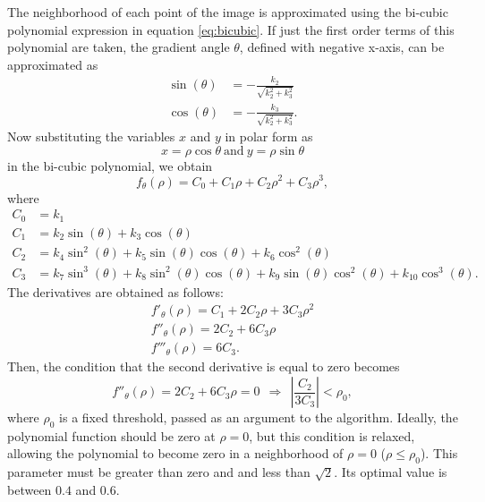 \documentclass{ipol}
\numberwithin{equation}{section}
\numberwithin{table}{section}
\begin{document}
The neighborhood of each point of the image is approximated using the bi-cubic polynomial 
expression in equation \ref{eq:bicubic}. If just the first order terms of this 
polynomial are taken, the gradient angle $\theta$, defined with negative x-axis, can be approximated as
\begin{align}
	\sin(\theta) & = -\frac{k_2}{\sqrt{k_2^2 + k_3^2}} \nonumber \\
	\cos(\theta) & = -\frac{k_3}{\sqrt{k_2^2 + k_3^2}}.  
\label{eq:sincos}
\end{align}
Now substituting the variables $x$ and $y$ in polar form as
\begin{equation*}
	x = \rho\cos{\theta} \: \text{and} \: y = \rho\sin{\theta} 
\end{equation*}
in the bi-cubic polynomial, we obtain
\begin{equation}
	f_{\theta}(\rho) = C_0 + C_1\rho + C_2\rho^2 + C_3\rho^3 ,
\end{equation}
where
\begin{align}
\label{eq:c}
	C_0 & = k_1 \nonumber \nonumber \\
	C_1 & = k_2\sin(\theta) + k_3\cos(\theta) \nonumber \\
	C_2 & = k_4\sin^2(\theta) + k_5\sin(\theta)\cos(\theta) + k_6\cos^2(\theta) \nonumber \\
	C_3 & = k_7\sin^3(\theta) + k_8\sin^2(\theta)\cos(\theta) + k_9\sin(\theta)\cos^2(\theta) + k_{10}\cos^3(\theta). 
\end{align}
The derivatives are obtained as follows:
\begin{align}
	f'_{\theta}(\rho) = C_1 + 2C_2\rho + 3C_3\rho^2 \nonumber \\
	f''_{\theta}(\rho) = 2C_2 + 6C_3\rho \nonumber \\
	f'''_{\theta}(\rho) = 6C_3 .\nonumber 
\end{align}
Then, the condition that the second derivative is equal to zero becomes
\begin{equation}
	f''_{\theta}(\rho) = 2C_2 + 6C_3\rho = 0 \ \ \Rightarrow \ \ \left| \frac{C_2}{3C_3} \right| < \rho_0,
\end{equation}
where $\rho_0$ is a fixed threshold, passed as an argument to the algorithm. Ideally, the polynomial function 
should be zero at $\rho=0$, but this condition is relaxed, allowing the polynomial to become zero in a neighborhood 
of $\rho=0$ ($\rho\leq\rho_0$). This parameter must be greater than zero and and less than $\sqrt{2}$. Its optimal 
value is between $0.4$ and $0.6$.
\end{document}
